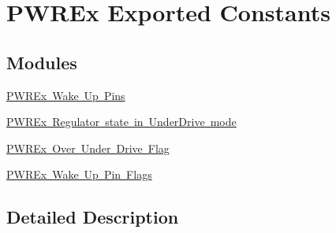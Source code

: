 \hypertarget{group___p_w_r_ex___exported___constants}{}\section{P\+W\+R\+Ex Exported Constants}
\label{group___p_w_r_ex___exported___constants}
\subsection*{Modules}
\begin{DoxyCompactItemize}
\item 
\mbox{\hyperlink{group___p_w_r_ex___wake_up___pins}{P\+W\+R\+Ex Wake Up Pins}}
\item 
\mbox{\hyperlink{group___p_w_r_ex___regulator__state__in___under_drive__mode}{P\+W\+R\+Ex Regulator state in Under\+Drive mode}}
\item 
\mbox{\hyperlink{group___p_w_r_ex___over___under___drive___flag}{P\+W\+R\+Ex Over Under Drive Flag}}
\item 
\mbox{\hyperlink{group___p_w_r_ex___wakeup___pins___flag}{P\+W\+R\+Ex Wake Up Pin Flags}}
\end{DoxyCompactItemize}


\subsection{Detailed Description}
